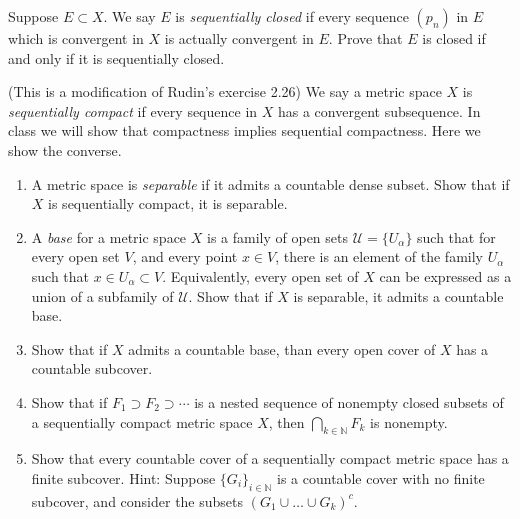 \documentclass[12pt,letterpaper,reqno]{amsart}
\newcounter{pset}
\numberwithin{equation}{section}
\newcommand{\bbN}{{\mathbb N}}
\newcommand{\ti}[1]{\textit{#1}}
\begin{document}
\noindent\hrulefill

\begin{exercise}
Suppose $E \subset X$. We say $E$ is \ti{sequentially closed} if every sequence $(p_n)$ in $E$ which is convergent in $X$
is actually convergent in $E$. Prove that $E$ is closed if and only if it is sequentially closed.
\end{exercise}

\begin{exercise} (This is a modification of Rudin's exercise 2.26) We say a metric space $X$ is \textit{sequentially compact} if every sequence in $X$ has a convergent subsequence. In class we will show that compactness implies sequential compactness. Here we show the converse.
\begin{enumerate}
\item  A metric space is \textit{separable} if it admits a countable dense subset. Show that if $X$ is sequentially compact, it is separable. 

\item A \textit{base} for a metric space $X$ is a family of open sets $\mathcal{U} = \{U_\alpha\}$ such that for every open set $V$, and every point $x\in V$, there is an element of the family $U_\alpha$ such that $x\in U_\alpha \subset V$. Equivalently, every open set of $X$ can be expressed as a union of a subfamily of $\mathcal{U}$. Show that if $X$ is separable, it admits a countable base. 

\item Show that if $X$ admits a countable base, than every open cover of $X$ has a countable subcover.

\item Show that if $F_1 \supset F_2 \supset \cdots$ is a nested sequence of nonempty closed subsets of a sequentially compact metric space $X$,  then $\bigcap_{k\in \bbN} F_k$ is nonempty.

\item Show that every countable cover of a sequentially compact metric space has a finite subcover. Hint:  Suppose $\{G_i\}_{i\in \bbN}$ is a countable cover with no finite subcover, and consider the subsets $(G_1\cup \dots \cup G_k)^c$.

\end{enumerate}
\end{exercise}



\end{document}
